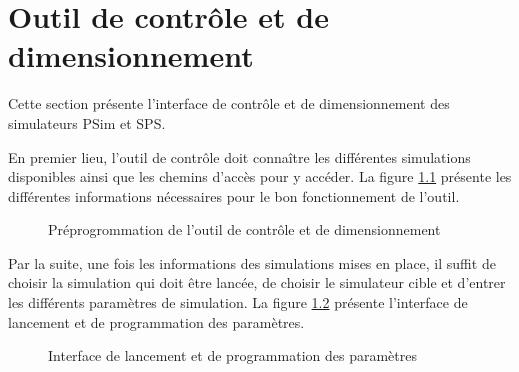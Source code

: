 \chapter{Outil de contrôle et de dimensionnement}
Cette section présente l'interface de contrôle et de dimensionnement des simulateurs PSim et SPS.

En premier lieu, l'outil de contrôle doit connaître les différentes simulations disponibles ainsi que les chemins d'accès pour y accéder. La figure \ref{outil1} présente les différentes informations nécessaires pour le bon fonctionnement de l'outil.

 \begin{figure}[htb]
 \centering
 \caption{Préprogrommation de l'outil de contrôle et de dimensionnement}
 \label{outil1}
 \end{figure}

Par la suite, une fois les informations des simulations mises en place, il suffit de choisir la simulation qui doit être lancée, de choisir le simulateur cible et d'entrer les différents paramètres de simulation. La figure \ref{outil2} présente l'interface de lancement et de programmation des paramètres.

 \begin{figure}[htb]
 \centering
 \caption{Interface de lancement et de programmation des paramètres}
 \label{outil2}
 \end{figure}

